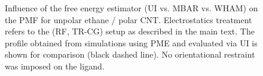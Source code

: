 \documentclass[9pt,lessons,pubversion]{livecoms}
\begin{document}
\begin{figure}
  \centering    
  \caption{
  Influence of the free energy estimator (UI vs. MBAR vs. WHAM) on the PMF for unpolar ethane / polar CNT. 
  Electrostatics treatment refers to the (RF, TR-CG) setup as described in the main text. The profile obtained from simulations using PME and evaluated via UI is shown for comparison (black dashed line).
  No orientational restraint was imposed on the ligand. 
  }
  \label{fig:polCNT_unpLig_estimator}
\end{figure}
\end{document}
